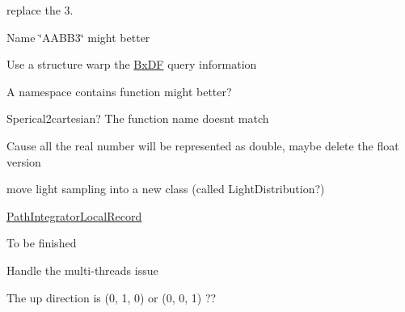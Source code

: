 
\begin{DoxyRefList}
\item[Member \mbox{\hyperlink{class_angle_adcf3b9ce618ebfc8fb83d2c2089afa2f}{Angle\+::Angle}} (double v, Angle\+Type type)]\label{todo__todo000007}%
%
replace the 3.  
\item[Class \mbox{\hyperlink{class_bounding_box3}{Bounding\+Box3\texorpdfstring{$<$}{<} Base\+Type \texorpdfstring{$>$}{>}}} ]\label{todo__todo000002}%
%
Name \char`\"{}\+AABB3\char`\"{} might better  
\item[Class \mbox{\hyperlink{class_bx_d_f}{Bx\+DF}} ]\label{todo__todo000015}%
%
Use a structure warp the \mbox{\hyperlink{class_bx_d_f}{Bx\+DF}} query information  
\item[Class \mbox{\hyperlink{class_coord_convertor}{Coord\+Convertor}} ]\label{todo__todo000004}%
%
A namespace contains function might better?  
\item[Member \mbox{\hyperlink{class_coord_convertor_a6f5154f84a5ed35b8602d27f4b7d3450}{Coord\+Convertor\+::cartesian2\+Spherical}} (const Point2d \&p)]\label{todo__todo000005}%
%
Sperical2cartesian? The function name doesn\textquotesingle{}t match  
\item[Module \mbox{\hyperlink{group___geometry}{Geometry}} ]\label{todo__todo000006}%
%
Cause all the real number will be represented as double, maybe delete the float version ~\newline
  
\item[Member \mbox{\hyperlink{class_path_integrator_ab4d7071e1c8e56d42a51a64f624bcaf6}{Path\+Integrator\+::choose\+One\+Light}} (std\+::shared\+\_\+ptr$<$ Scene $>$ scene, const Intersection \&its, const \mbox{\hyperlink{struct_ray}{Ray}} \&ray, double light\+Sample)]\label{todo__todo000014}%
%
move light sampling into a new class (called Light\+Distribution?)  
\item[Class \mbox{\hyperlink{struct_path_integrator_local_record}{Path\+Integrator\+Local\+Record}} ]\label{todo__todo000013}%
%
\mbox{\hyperlink{struct_path_integrator_local_record}{Path\+Integrator\+Local\+Record}}  
\item[Class \mbox{\hyperlink{class_r_g_b_spectrum}{RGBSpectrum}} ]\label{todo__todo000001}%
%
To be finished  
\item[Class \mbox{\hyperlink{class_sampler}{Sampler}} ]\label{todo__todo000016}%
%
Handle the multi-\/threads issue  
\item[File \mbox{\hyperlink{_warp_8h}{Warp.h}} ]\label{todo__todo000011}%
%
The up direction is (0, 1, 0) or (0, 0, 1) ?? 
\end{DoxyRefList}